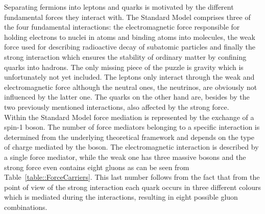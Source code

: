 Separating fermions into leptons and quarks is motivated by the different fundamental forces they interact with.
The Standard Model comprises three of the four fundamental interactions: the electromagnetic force responsible for holding electrons to nuclei in atoms and binding atoms into molecules, the weak force used for describing radioactive decay of subatomic particles and finally the strong interaction which ensures the stability of ordinary matter by confining quarks into hadrons.
The only missing piece of the puzzle is gravity which is unfortunately not yet included.
The leptons only interact through the weak and electromagnetic force although the neutral ones, the neutrinos, are obviously not influenced by the latter one. The quarks on the other hand are, besides by the two previously mentioned interactions, also affected by the strong force.
\\
Within the Standard Model force mediation is represented by the exchange of a spin-1 boson. 
The number of force mediators belonging to a specific interaction is determined from the underlying theoretical framework and depends on the type of charge mediated by the boson. The electromagnetic interaction is described by a single force mediator, while the weak one has three massive bosons and the strong force even contains eight gluons as can be seen from Table~\ref{table::ForceCarriers}.
This last number follows from the fact that from the point of view of the strong interaction each quark occurs in three different colours which is mediated during the interactions, resulting in eight possible gluon combinations.
